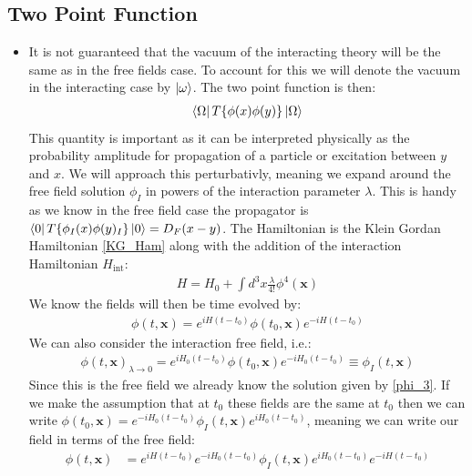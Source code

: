 \documentclass[11pt]{article}
\numberwithin{equation}{section}
\begin{document}
  \subsection{Two Point Function} %
   \label{sub:two_point_function}
   \begin{itemize}
     \item It is not guaranteed that the vacuum of the interacting theory will be the same as in the free fields case. To account for this we will denote the vacuum in the interacting case by $\ket{\omega}$. The two point function is then:
     \begin{align}
     \label{two_point}
       \bra{\Omega}T\{\phi(x)\phi(y)\}\ket{\Omega}
     \end{align}
     This quantity is important as it can be interpreted physically as the probability amplitude for propagation of a particle or excitation between $y$ and $x$. We will approach this perturbativly, meaning we expand around the free field solution $\phi_I$ in powers of the interaction parameter $\lambda$. This is handy as we know in the free field case the propagator is $\bra{0}T\{\phi_I(x)\phi(y)_I\}\ket{0} = D_F(x-y)$. The Hamiltonian is the Klein Gordan Hamiltonian \ref{KG_Ham} along with the addition of the interaction Hamiltonian $H_{\text{int}}$:
     \begin{align}
     \label{H_int}
        H = H_{0}+\int d^3x \frac{\lambda}{4!}\phi^4(\textbf{x})
      \end{align} 
      We know the fields will then be time evolved by: 
      \begin{align*}
        \phi(t,\textbf{x}) = e^{iH(t-t_0)}\phi(t_0,\textbf{x})e^{-iH(t-t_0)}
      \end{align*}
      We can also consider the interaction free field, i.e.:
      \begin{align}
      \label{phi_free}
        \phi(t,\textbf{x})_{\lambda \rightarrow 0} = e^{iH_0(t-t_0)}\phi(t_0,\textbf{x})e^{-iH_0(t-t_0)} \equiv \phi_I(t,\textbf{x})
      \end{align}
      Since this is the free field we already know the solution given by \ref{phi_3}. If we make the assumption that at $t_0$ these fields are the same at $t_0$ then we can write $\phi(t_0,\textbf{x}) = e^{-iH_0(t-t_0)}\phi_I(t,\textbf{x})e^{iH_0(t-t_0)}$, meaning we can write our field in terms of the free field:
      \begin{align*}
        \phi(t,\textbf{x}) &= e^{iH(t-t_0)}e^{-iH_0(t-t_0)}\phi_I(t,\textbf{x})e^{iH_0(t-t_0)}e^{-iH(t-t_0)} \\

\end{align*}
\end{itemize}
\end{document}
